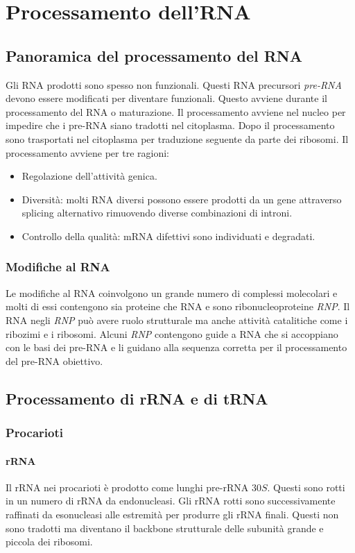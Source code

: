 \chapter{Processamento dell'RNA}
\section{Panoramica del processamento del RNA}
Gli RNA prodotti sono spesso non funzionali. Questi RNA precursori \emph{pre-RNA} devono essere modificati per diventare funzionali. Questo avviene durante il processamento del RNA o 
maturazione. Il processamento avviene nel nucleo per impedire che i pre-RNA siano tradotti nel citoplasma. Dopo il processamento sono trasportati nel citoplasma per traduzione 
seguente da parte dei ribosomi. Il processamento avviene per tre ragioni:
\begin{itemize}
	\item Regolazione dell'attivit\`a genica.
	\item Diversit\`a: molti RNA diversi possono essere prodotti da un gene attraverso splicing alternativo rimuovendo diverse combinazioni di introni.
	\item Controllo della qualit\`a: mRNA difettivi sono individuati e degradati.
\end{itemize}
\subsection{Modifiche al RNA}
Le modifiche al RNA coinvolgono un grande numero di complessi molecolari e molti di essi contengono sia proteine che RNA e sono ribonucleoproteine \emph{RNP}. Il RNA negli \emph{RNP}
pu\`o avere ruolo strutturale ma anche attivit\`a catalitiche come i ribozimi e i ribosomi. Alcuni \emph{RNP} contengono guide a RNA che si accoppiano con le basi dei pre-RNA e li 
guidano alla sequenza corretta per il processamento del pre-RNA obiettivo. 
\section{Processamento di rRNA e di tRNA}
\subsection{Procarioti}
\subsubsection{rRNA}
Il rRNA nei procarioti \`e prodotto come lunghi pre-rRNA $30S$. Questi sono rotti in un numero di rRNA da endonucleasi. Gli rRNA rotti sono successivamente raffinati da esonucleasi alle
estremit\`a per produrre gli rRNA finali. Questi non sono tradotti ma diventano il backbone strutturale delle subunit\`a grande e piccola dei ribosomi. 
